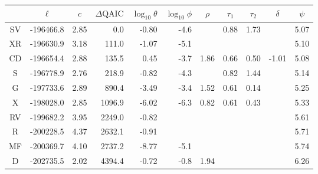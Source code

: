 \begin{tabular}{crrrrrrrrrr}
  \hline
 & \multicolumn{1}{c}{$\ell$} & \multicolumn{1}{c}{$\hat{c}$} & \multicolumn{1}{c}{$\Delta\!\mathrm{QAIC}$} & \multicolumn{1}{c}{$\log_{10}{\theta}$} & \multicolumn{1}{c}{$\log_{10}{\phi}$} & \multicolumn{1}{c}{$\rho$} & \multicolumn{1}{c}{$\tau_1$} & \multicolumn{1}{c}{$\tau_2$} & \multicolumn{1}{c}{$\delta$} & \multicolumn{1}{c}{$\psi$} \\ 
  \hline
SV & -196466.8 & 2.85 & 0.0 & -0.80 & -4.6 &  & 0.88 & 1.73 &  & 5.07 \\ 
  XR & -196630.9 & 3.18 & 111.0 & -1.07 & -5.1 &  &  &  &  & 5.10 \\ 
  CD & -196654.4 & 2.88 & 135.5 & 0.45 & -3.7 & 1.86 & 0.66 & 0.50 & -1.01 & 5.08 \\ 
  S & -196778.9 & 2.76 & 218.9 & -0.82 & -4.3 &  & 0.82 & 1.44 &  & 5.14 \\ 
  G & -197733.6 & 2.89 & 890.4 & -3.49 & -3.4 & 1.52 & 0.61 & 0.14 &  & 5.25 \\ 
  X & -198028.0 & 2.85 & 1096.9 & -6.02 & -6.3 & 0.82 & 0.61 & 0.43 &  & 5.33 \\ 
  RV & -199682.2 & 3.95 & 2249.0 & -0.82 &  &  &  &  &  & 5.61 \\ 
  R & -200228.5 & 4.37 & 2632.1 & -0.91 &  &  &  &  &  & 5.71 \\ 
  MF & -200369.7 & 4.10 & 2737.2 & -8.77 & -5.1 &  &  &  &  & 5.74 \\ 
  D & -202735.5 & 2.02 & 4394.4 & -0.72 & -0.8 & 1.94 &  &  &  & 6.26 \\ 
   \hline
\end{tabular}
